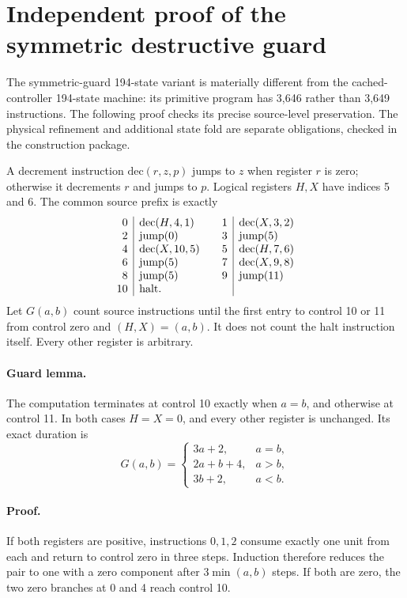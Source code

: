 \section{Independent proof of the symmetric destructive guard}

The symmetric-guard 194-state variant is materially different from the
cached-controller 194-state machine: its primitive program has 3,646
rather than 3,649 instructions. The following proof checks its precise
source-level preservation. The physical refinement and additional state
fold are separate obligations, checked in the construction package.

A decrement instruction $\mathrm{dec}(r,z,p)$ jumps to $z$ when register
$r$ is zero; otherwise it decrements $r$ and jumps to $p$. Logical
registers $H,X$ have indices 5 and 6. The common source prefix is exactly
\[
\begin{array}{r|l@{\qquad}r|l}
0&\mathrm{dec}(H,4,1)&1&\mathrm{dec}(X,3,2)\\
2&\mathrm{jump}(0)&3&\mathrm{jump}(5)\\
4&\mathrm{dec}(X,10,5)&5&\mathrm{dec}(H,7,6)\\
6&\mathrm{jump}(5)&7&\mathrm{dec}(X,9,8)\\
8&\mathrm{jump}(5)&9&\mathrm{jump}(11)\\
10&\mathrm{halt}.&&
\end{array}
\]
Let $G(a,b)$ count source instructions until the first entry to control
10 or 11 from control zero and $(H,X)=(a,b)$. It does not count the halt
instruction itself. Every other register is arbitrary.

\paragraph{Guard lemma.}
The computation terminates at control 10 exactly when $a=b$, and otherwise
at control 11. In both cases $H=X=0$, and every other register is
unchanged. Its exact duration is
\[
G(a,b)=
\begin{cases}
3a+2,&a=b,\\
2a+b+4,&a>b,\\
3b+2,&a<b.
\end{cases}
\tag{SG1}
\]

\paragraph{Proof.}
If both registers are positive, instructions $0,1,2$ consume exactly
one unit from each and return to control zero in three steps. Induction
therefore reduces the pair to one with a zero component after
$3\min(a,b)$ steps. If both are zero, the two zero branches at 0 and 4
reach control 10.


